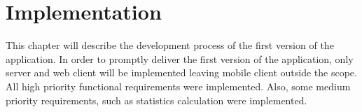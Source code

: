 
\chapter{Implementation}\label{ch:implementation}

This chapter will describe the development process of the first version of the application.
In order to promptly deliver the first version of the application, only server and web client will be implemented leaving mobile client outside the scope.
All high priority functional requirements were implemented.
Also, some medium priority requirements, such as statistics calculation were implemented.






